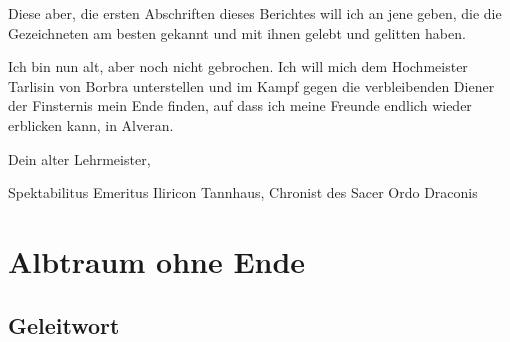 Diese aber, die ersten Abschriften dieses Berichtes will ich an jene geben, die die Gezeichneten am besten gekannt und mit ihnen gelebt und gelitten haben.\par\medskip

Ich bin nun alt, aber noch nicht gebrochen. Ich will mich dem Hochmeister Tarlisin von Borbra unterstellen und im Kampf gegen die verbleibenden Diener der Finsternis mein Ende finden, auf dass ich meine Freunde endlich wieder erblicken kann, in Alveran.\par\medskip

Dein alter Lehrmeister,\par
Spektabilitus Emeritus Iliricon Tannhaus, Chronist des Sacer Ordo Draconis



\chapter{Albtraum ohne Ende}

\section{Geleitwort}

